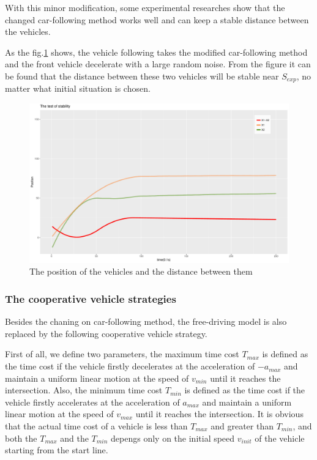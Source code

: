 \documentclass[a4paper,UTF8]{paper}
\begin{document}
With this minor modification, some experimental researches show that the changed car-following method works well and can keep a stable distance between the vehicles.

As the fig.\ref{carf} shows, the vehicle following takes the modified car-following method and the front vehicle decelerate with a large random noise. From the figure it can be found that the distance between these two vehicles will be stable near $S_{exp}$, no matter what initial situation is chosen.
\begin{figure}
\centering
\includegraphics[width=\textwidth]{NearlyGoDie_2.pdf}
\caption{The position of the vehicles and the distance between them}
\label{carf}
\end{figure}
\subsubsection{The cooperative vehicle strategies}
\label{section:tgs}
Besides the chaning on car-following method, the free-driving model is also replaced by the following cooperative vehicle strategy. 

First of all, we define two parameters, the maximum time cost $T_{max}$ is defined as the time cost if the vehicle firstly decelerates at the acceleration of $-a_{max}$ and maintain a uniform linear motion at the speed of $v_{min}$ until it reaches the intersection. Also, the minimum time cost $T_{min}$ is defined as the time cost if the vehicle firstly accelerates at the acceleration of $a_{max}$ and maintain a uniform linear motion at the speed of $v_{max}$ until it reaches the intersection. It is obvious that the actual time cost of a vehicle is less than $T_{max}$ and greater than $T_{min}$, and both the $T_{max}$ and the $T_{min}$ depengs only on the initial speed $v_{init}$ of the vehicle starting from the start line.
\end{document}
